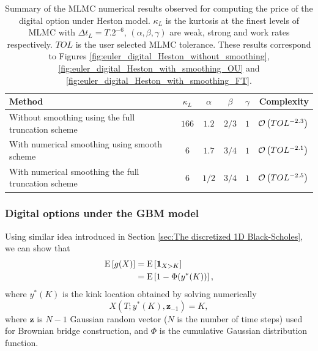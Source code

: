 \begin{table}[!h]
	\centering
	\begin{small}
	\begin{tabular}{l*{4}{c}r}
	\toprule[1.5pt]
		Method      &     $\kappa_{L}$ & $\alpha$   &  $\beta$  &  $\gamma$   & Complexity \\
		\hline
			Without smoothing using the full truncation scheme & $166$ & $1.2$  &  $2/3$&  $1$&  ${\mathcal{O}}\left(TOL^{-2.3}\right)$\\	
              \hline 
            With numerical smoothing  using smooth scheme & $6$ & $1.7$  &  $3/4$ & $1$ &  ${\mathcal{O}}\left(TOL^{-2.1}\right)$\\	
               \hline
           With numerical smoothing  the full truncation scheme & $6$ & $1/2$  &  $3/4$&  $1$ &  ${\mathcal{O}}\left(TOL^{-2.5}\right)$\\	 
		\bottomrule[1.25pt]
	\end{tabular}
\end{small}
	\caption{Summary of the MLMC numerical results observed for  computing the price of the digital option under Heston model. $\kappa_{L}$ is the kurtosis at the finest levels of MLMC with $\Delta t_{L}=T.2^{-6}$, $(\alpha,\beta,\gamma)$ are weak, strong and work rates respectively. $TOL$ is the user selected  MLMC  tolerance.  These results correspond to Figures \ref{fig:euler_digital_Heston_without_smoothing}, \ref{fig:euler_digital_Heston_with_smoothing_OU} and \ref{fig:euler_digital_Heston_with_smoothing_FT}.}
	\label{table:Summary of our numerical results digital Heston.}
\end{table}
\FloatBarrier
\subsubsection{Digital options under the GBM model}\label{sec:Digital options under the GBM model}
Using similar idea introduced in Section \ref{sec:The discretized 1D Black-Scholes}, we can show that
\begin{align}
\mathrm{E}\left[g(X)\right]&=\mathrm{E}\left[\mathbf{1}_{X>K}\right]\nonumber\\
&=\mathrm{E}\left[1-\Phi(y^\ast(K))\right],
\end{align}
where $y^\ast(K)$ is the kink location obtained by solving numerically 
$$X(T; y^\ast(K), \mathbf{z}_{-1})=K,$$
where  $\mathbf{z}$ is $N-1$ Gaussian random  vector ($N$ is the number of time steps) used for Brownian bridge construction, and $\Phi$ is the cumulative Gaussian distribution function.

